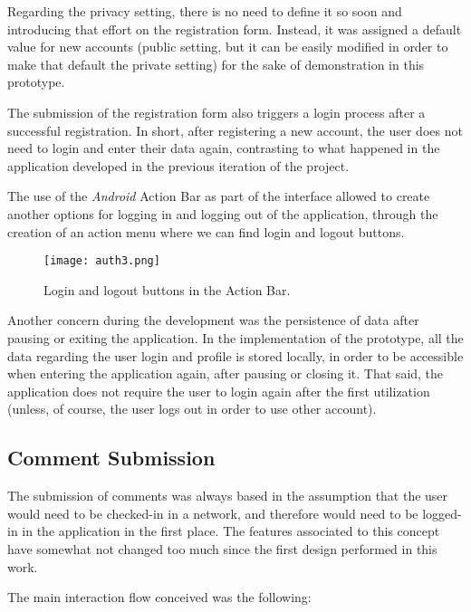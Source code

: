Regarding the privacy setting, there is no need to define it so soon and introducing that effort on the registration form. Instead, it was assigned a default value for new accounts (public setting, but it can be easily modified in order to make that default the private setting) for the sake of demonstration in this prototype.

The submission of the registration form also triggers a login process after a successful registration. In short, after registering a new account, the user does not need to login and enter their data again, contrasting to what happened in the application developed in the previous iteration of the project.

The use of the \emph{Android} Action Bar as part of the interface allowed to create another options for logging in and logging out of the application, through the creation of an action menu where we can find login and logout buttons.

\begin{figure}[h!]
  \begin{center}
    \leavevmode
    \texttt{[image: auth3.png]}
    \caption{Login and logout buttons in the Action Bar.}
    \label{fig:auth3}
  \end{center}
\end{figure}

Another concern during the development was the persistence of data after pausing or exiting the application. In the implementation of the prototype, all the data regarding the user login and profile is stored locally, in order to be accessible when entering the application again, after pausing or closing it. That said, the application does not require the user to login again after the first utilization (unless, of course, the user logs out in order to use other account).

\subsection{Comment Submission}\label{comment}

The submission of comments was always based in the assumption that the user would need to be checked-in in a network, and therefore would need to be logged-in in the application in the first place. 
The features associated to this concept have somewhat not changed too much since the first design performed in this work.

The main interaction flow conceived was the following:

